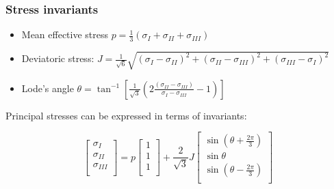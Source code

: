 \documentclass[notes]{beamer}
\begin{document}
\begin{frame}
\frametitle{Stress invariants}
\begin{itemize}
	\item Mean effective stress $p = \frac{1}{3}(\sigma_I + \sigma_{II} + \sigma_{III})$
	\item Deviatoric stress: $J = \frac{1}{\sqrt{6}}\sqrt{(\sigma_I - \sigma_{II})^2 + (\sigma_{II} - \sigma_{III})^2 + (\sigma_{III} - \sigma_I)^2}$
	\item Lode's angle $\theta = \tan^{-1}\left[\frac{1}{\sqrt{3}}\left(2\frac{(\sigma_{II} - \sigma_{III})}{\sigma_I - \sigma_{III}} -1 \right)\right]$
\end{itemize}

Principal stresses can be expressed in terms of invariants:

\begin{equation*}
\begin{bmatrix}
\sigma_I \\
\sigma_{II} \\
\sigma_{III} \\
\end{bmatrix} = 
p \begin{bmatrix}
1 \\
1 \\
1 \\
\end{bmatrix} + 
\frac{2}{\sqrt{3}}J
\begin{bmatrix}
\sin\left(\theta + \frac{2 \pi}{3}\right) \\
\sin \theta \\
\sin\left(\theta - \frac{2 \pi}{3}\right) \\
\end{bmatrix}
\end{equation*}
\end{frame}
\end{document}
